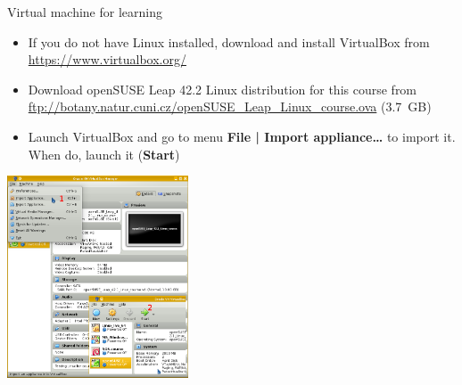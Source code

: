 \documentclass[compress, ucs, xelatex, 11pt, xcolor=svgnames,
  hyperref={
    bookmarks=true,
    unicode=true,
    colorlinks=true,
    pdftitle={Linux, command line and MetaCentrum},
    plainpages=false,
    pdfauthor={Vojtech Zeisek},
    pdfsubject={Course about use of Linux command line, writing shell scripts and using MetaCentrum of CESNET},
    pdfcreator={XeLaTeX},
    pdfkeywords={Linux, GNU, BASH, shell, command line, MetaCentrum},
    linkcolor=DarkRed,
    anchorcolor=DarkBlue,
    citecolor=Indigo,
    filecolor=NavyBlue,
    menucolor=DarkMagenta,
    urlcolor=DarkBlue,
    pdftex},
  url={hyphens, lowtilde} %
  ]{beamer}
\begin{document}
\begin{frame}{Virtual machine for learning}
  \label{VBox}
  \begin{multicols}{2}
    \begin{itemize}
      \item If you do not have Linux installed, download and install VirtualBox from \url{https://www.virtualbox.org/}
      \item Download openSUSE Leap 42.2 Linux distribution for this course from \url{ftp://botany.natur.cuni.cz/openSUSE_Leap_Linux_course.ova} (3.7~GB)
      \item Launch VirtualBox and go to menu \textbf{File | Import appliance\ldots} to import it. When do, launch it (\textbf{Start})
    \end{itemize}
    \includegraphics[height=6cm]{virtualbox.png}
  \end{multicols}
\end{frame}
\end{document}
